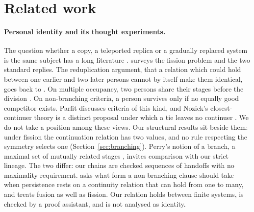 \section{Related work}
\label{sec:related}

\paragraph{Personal identity and its thought experiments.}
The question whether a copy, a teleported replica or a gradually replaced
system is the same subject has a long literature
\citep{Williams1970, Parfit1971, Perry1972, Lewis1976, Nozick1981, Parfit1984}.
\citet{Olson2023SEP} surveys the fission problem and the two standard replies.
The reduplication argument, that a relation which could hold between one
earlier and two later persons cannot by itself make them identical, goes back
to \citet{Williams1957}.
On multiple occupancy, two persons share their stages before the division
\citep{Lewis1976}. On non-branching criteria, a person survives only if no
equally good competitor exists. Parfit discusses criteria of this kind, and
Nozick's closest-continuer theory is a distinct proposal under which a tie
leaves no continuer \citep{Nozick1981}. We do not take a position among these
views. Our structural results sit beside them: under fission the continuation
relation has two values, and no rule respecting the symmetry selects one
(Section~\ref{sec:branching}). Perry's notion of a branch, a maximal set of
mutually related stages \citep{Perry1972}, invites comparison with our strict
lineage. The two differ: our chains are checked sequences of handoffs with no
maximality requirement. \citet{Gustafsson2019} asks what form a non-branching
clause should take when persistence rests on a continuity relation that can
hold from one to many, and treats fusion as well as fission. Our relation
holds between finite systems, is checked by a proof assistant, and is not
analysed as identity.

